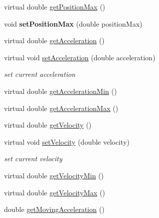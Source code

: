 \begin{DoxyCompactItemize}
\item 
virtual double \hyperlink{classdrobot_1_1device_1_1actuator_1_1PhidgetAdvancedServo_a12335ab5360aa850bbc0a3b52028d62a}{get\-Position\-Max} ()
\item 
\hypertarget{classdrobot_1_1device_1_1actuator_1_1PhidgetAdvancedServo_a4243dcae6051395e043216cad46b2f4d}{void {\bfseries set\-Position\-Max} (double position\-Max)}\label{classdrobot_1_1device_1_1actuator_1_1PhidgetAdvancedServo_a4243dcae6051395e043216cad46b2f4d}

\item 
virtual double \hyperlink{classdrobot_1_1device_1_1actuator_1_1PhidgetAdvancedServo_ae7fa5d92717bd981d753ef03b9c32da9}{get\-Acceleration} ()
\item 
virtual void \hyperlink{classdrobot_1_1device_1_1actuator_1_1PhidgetAdvancedServo_a7c1d34496318852e20f81b145584c852}{set\-Acceleration} (double acceleration)
\begin{DoxyCompactList}\small\item\em set current acceleration \end{DoxyCompactList}\item 
virtual double \hyperlink{classdrobot_1_1device_1_1actuator_1_1PhidgetAdvancedServo_a5ff12831380c5ed0cd0ed131d0725f2b}{get\-Acceleration\-Min} ()
\item 
virtual double \hyperlink{classdrobot_1_1device_1_1actuator_1_1PhidgetAdvancedServo_a91960e941fe0813b402dbb214f41be2e}{get\-Acceleration\-Max} ()
\item 
virtual double \hyperlink{classdrobot_1_1device_1_1actuator_1_1PhidgetAdvancedServo_ade608d8b4b469ae3203fcf968f3b1455}{get\-Velocity} ()
\item 
virtual void \hyperlink{classdrobot_1_1device_1_1actuator_1_1PhidgetAdvancedServo_ae960026b28343c37bf163bd7c0f84e4b}{set\-Velocity} (double velocity)
\begin{DoxyCompactList}\small\item\em set current velocity \end{DoxyCompactList}\item 
virtual double \hyperlink{classdrobot_1_1device_1_1actuator_1_1PhidgetAdvancedServo_a77b7e687934b58aec83d19c62071bf69}{get\-Velocity\-Min} ()
\item 
virtual double \hyperlink{classdrobot_1_1device_1_1actuator_1_1PhidgetAdvancedServo_a9a0090b6dcdb7dd022687665f4ca9dd9}{get\-Velocity\-Max} ()
\item 
double \hyperlink{classdrobot_1_1device_1_1actuator_1_1PhidgetAdvancedServo_a517f67d4607950f36b67f31ff2c8f9ab}{get\-Moving\-Acceleration} ()

\end{DoxyCompactItemize}
